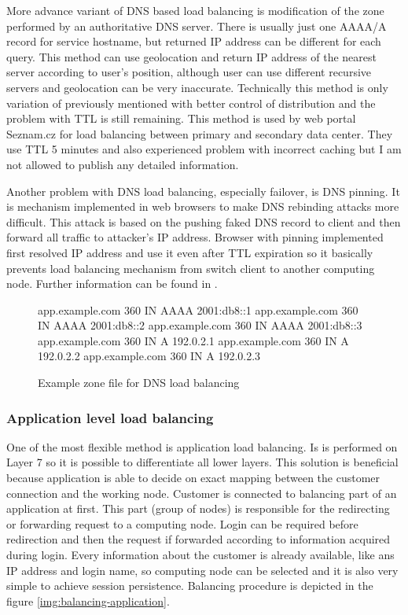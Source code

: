 More advance variant of \Ac{DNS} based load balancing is modification of the zone performed by an authoritative \Ac{DNS} server. There is usually just one AAAA/A record for service hostname, but returned \Ac{IP} address can be different for each query. This method can use geolocation and return \Ac{IP} address of the nearest server according to user's position, although user can use different recursive servers and geolocation can be very inaccurate. Technically this method is only variation of previously mentioned with better control of distribution and the problem with \Ac{TTL} is still remaining. This method is used by web portal Seznam.cz for load balancing between primary and secondary data center. They use \Ac{TTL} 5 minutes and also experienced problem with incorrect caching but I am not allowed to publish any detailed information.

Another problem with DNS load balancing, especially failover, is \Ac{DNS} pinning. It is mechanism implemented in web browsers to make \Ac{DNS} rebinding attacks more difficult. This attack is based on the pushing faked \Ac{DNS} record to client and then forward all traffic to attacker's \Ac{IP} address. Browser with pinning implemented  first resolved \Ac{IP} address and use it even after \Ac{TTL} expiration so it basically prevents load balancing mechanism from switch client to another computing node. Further information can be found in \cite{dns-pinning}.

\begin{figure}[htb]
\caption{Example zone file for DNS load balancing}
\label{code:zone}
\begin{verbatimtab}
app.example.com	360	IN	AAAA	2001:db8::1
app.example.com	360	IN	AAAA	2001:db8::2
app.example.com	360	IN	AAAA	2001:db8::3
app.example.com	360	IN	A	192.0.2.1
app.example.com	360	IN	A	192.0.2.2
app.example.com	360	IN	A	192.0.2.3
\end{verbatimtab}
\end{figure}

\subsubsection{Application level load balancing}
One of the most flexible method is application load balancing. Is is performed on Layer 7 so it is possible to differentiate all lower layers. This solution is beneficial because application is able to decide on exact mapping between the customer connection and the working node. 
Customer is connected to balancing part of an application at first. This part (group of nodes) is responsible for the redirecting or forwarding request to a computing node. Login can be required before redirection and then the request if forwarded according to information acquired during login. Every information about the customer is already available, like ans \Ac{IP} address and login name, so computing node can be selected and it is also very simple to achieve session persistence. Balancing procedure is depicted in the figure \ref{img:balancing-application}.

